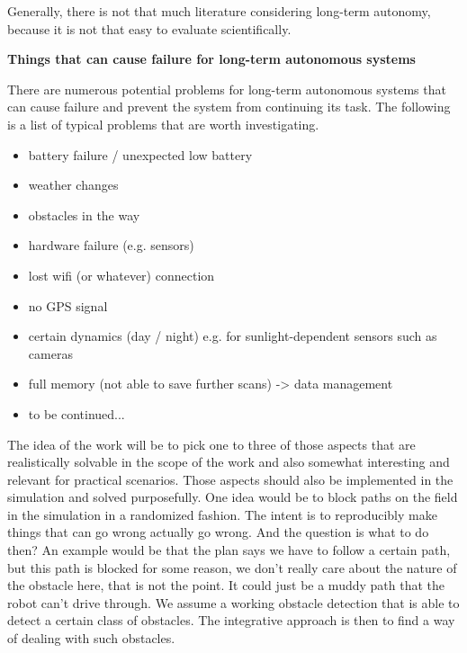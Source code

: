 \documentclass[german, master, expose, latin1]{base/thesis_KBS}
\begin{document}
Generally, there is not that much literature considering long-term autonomy, because it is not that easy to evaluate scientifically.\newline

\textbf{Things that can cause failure for long-term autonomous systems}\newline

There are numerous potential problems for long-term autonomous systems that can cause failure and prevent the system from continuing its task.
The following is a list of typical problems that are worth investigating.

\begin{itemize}
    \item battery failure / unexpected low battery
    \item weather changes
    \item obstacles in the way
    \item hardware failure (e.g. sensors)
    \item lost wifi (or whatever) connection
    \item no GPS signal
    \item certain dynamics (day / night) e.g. for sunlight-dependent sensors such as cameras
    \item full memory (not able to save further scans) -> data management
    \item to be continued...
\end{itemize}

The idea of the work will be to pick one to three of those aspects that are realistically solvable in the scope of the work and also somewhat interesting and 
relevant for practical scenarios. Those aspects should also be implemented in the simulation and solved purposefully.\newline
One idea would be to block paths on the field in the simulation in a randomized fashion. The intent is to reproducibly make things that can go wrong actually go wrong.
And the question is what to do then? An example would be that the plan says we have to follow a certain path, but this path is blocked for some reason, we don't really
care about the nature of the obstacle here, that is not the point. It could just be a muddy path that the robot can't drive through. We assume a working obstacle detection
that is able to detect a certain class of obstacles. The integrative approach is then to find a way of dealing with such obstacles.\newline
\end{document}
